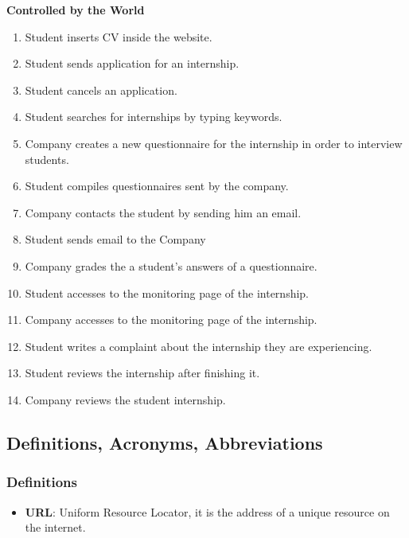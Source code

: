 \documentclass{article}
\begin{document}
\begin{flushleft}
    \textbf{Controlled by the World}
\end{flushleft}
    \begin{enumerate}[label=SPW\arabic*.]
    \item Student inserts CV inside the website.
    \item Student sends application for an internship.
    \item Student cancels an application.
    \item Student searches for internships by typing keywords.
    \item Company creates a new questionnaire for the internship in order to interview students.
    \item Student compiles questionnaires sent by the company.
    \item Company contacts the student by sending him an email.
    \item Student sends email to the Company
    \item Company grades the a student's answers of a questionnaire.
    \item Student accesses to the monitoring page of the internship.
    \item Company accesses to the monitoring page of the internship.
    \item Student writes a complaint about the internship they are experiencing.
    \item Student reviews the internship after finishing it.
    \item Company reviews the student internship.
    
\end{enumerate}





\subsection{Definitions, Acronyms, Abbreviations}


\subsubsection{Definitions}
\begin{itemize}
    \item \textbf{URL}: Uniform Resource Locator, it  is the address of a unique resource on the internet.
\end{itemize}
\end{document}
